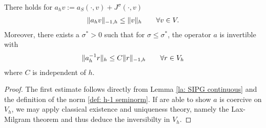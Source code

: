 \begin{theorem}[Stability]\label{thm: SIPG stability}
There holds for $a_h v :=a_S(\cdot, v)+J^\sigma(\cdot, v)$
	\begin{align*}
	 	\HMinusOneDnorm{a_h v} \leq \eNorm v \qquad \forall v \in V. %
	 \end{align*}
	 Moreover, there exists a $\sigma^* > 0$ such that for $\sigma \leq \sigma^* $, the operator $a$ is invertible with 
	 \begin{align*}
	 	\eNorm {a_h^{-1} r} \leq C \HMinusOneDnorm r \qquad \forall r \in V_h %
	 \end{align*}
	 where $C$ is independent of $h$. 
\end{theorem}
\begin{proof}
	The first estimate follows directly from Lemma \ref{la: SIPG continuous} and the definition of the norm \ref{def: h-1 seminorm}. If are able to show $a$ is coercive on $V_h$, we may apply classical existence and uniqueness theory, namely the Lax-Milgram theorem and thus deduce the inversibilty in $V_h$.
	
	
	

\end{proof}
